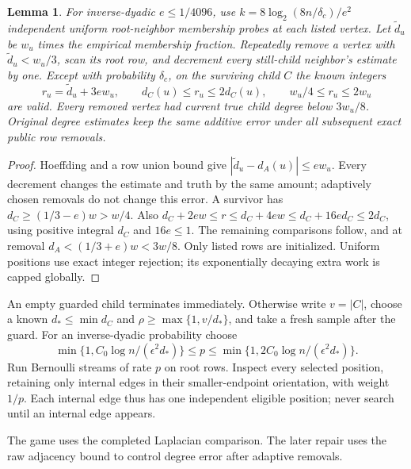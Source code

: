 \documentclass[11pt]{article}
\newtheorem{lemma}[theorem]{Lemma}
\theoremstyle{remark}
\begin{document}
\begin{lemma}\label{struct27:lem:guard}
For inverse-dyadic $e\le1/4096$, use $k=8 \log_2(8n/\delta_c) /e^2$
independent uniform root-neighbor membership probes at each listed vertex.
Let $\widetilde d_u$ be $w_u$ times the empirical membership fraction.
Repeatedly remove a vertex with $\widetilde d_u<w_u/3$, scan its root row, and
decrement every still-child neighbor's estimate by one.
Except with probability $\delta_c$, on the surviving child $C$ the known
integers
\begin{equation}\label{struct27:eq:guard}
 r_u= \widetilde d_u+3ew_u ,\qquad
 d_C(u)\le r_u\le2d_C(u),\qquad w_u/4\le r_u\le2w_u
\end{equation}
are valid.
Every removed vertex had current true child degree below $3w_u/8$.
Original degree estimates keep the same additive error under all subsequent
exact public row removals.
\end{lemma} \begin{proof} Hoeffding and a row union bound give $|\widetilde
d_u-d_A(u)|\le ew_u$.
Every decrement changes the estimate and truth by the same amount; adaptively
chosen removals do not change this error.
A survivor has $d_C\ge(1/3-e)w>w/4$.
Also $d_C+2ew\le r\le d_C+4ew \le d_C+16ed_C \le2d_C$,
using positive integral $d_C$ and $16e\le1$.
The remaining comparisons follow, and at removal $d_A<(1/3+e)w<3w/8$.
Only listed rows are initialized.
Uniform positions use exact integer rejection; its exponentially decaying extra
work is capped globally.
\end{proof}

An empty guarded child terminates immediately.
Otherwise write $v=|C|$, choose a known $d_*\le\min d_C$ and
$\rho\ge\max\{1,v/d_*\}$, and take a fresh sample after the guard.
For an inverse-dyadic probability choose
\begin{equation}\label{struct27:eq:samplep}
 \min\{1,C_0\log n/(\epsilon^2d_*)\}\le p
 \le\min\{1,2C_0\log n/(\epsilon^2d_*)\}.
\end{equation}
Run Bernoulli streams of rate $p$ on root rows.
Inspect every selected position, retaining only internal edges in their
smaller-endpoint orientation, with weight $1/p$.
Each internal edge thus has one independent eligible position; never search
until an internal edge appears.

The game uses the completed Laplacian comparison.
The later repair uses the raw adjacency bound to control degree error after
adaptive removals.
\end{document}
